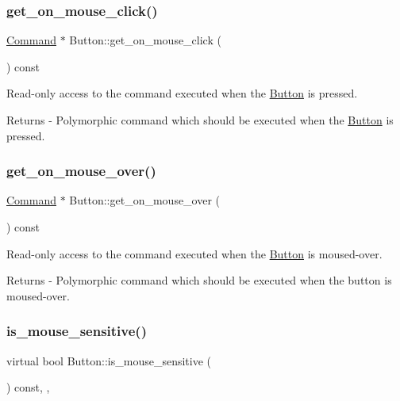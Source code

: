 \subsubsection{\texorpdfstring{get\+\_\+on\+\_\+mouse\+\_\+click()}{get\_on\_mouse\_click()}}
{\footnotesize\ttfamily \mbox{\hyperlink{class_command}{Command}} $\ast$ Button\+::get\+\_\+on\+\_\+mouse\+\_\+click (\begin{DoxyParamCaption}{ }\end{DoxyParamCaption}) const}

Read-\/only access to the command executed when the \mbox{\hyperlink{class_button}{Button}} is pressed. \begin{DoxyReturn}{Returns}
-\/ Polymorphic command which should be executed when the \mbox{\hyperlink{class_button}{Button}} is pressed. 
\end{DoxyReturn}
\mbox{\label{class_button_a3f9b964049bde58b8f39170ce8b6fa2e}} 
\subsubsection{\texorpdfstring{get\+\_\+on\+\_\+mouse\+\_\+over()}{get\_on\_mouse\_over()}}
{\footnotesize\ttfamily \mbox{\hyperlink{class_command}{Command}} $\ast$ Button\+::get\+\_\+on\+\_\+mouse\+\_\+over (\begin{DoxyParamCaption}{ }\end{DoxyParamCaption}) const}

Read-\/only access to the command executed when the \mbox{\hyperlink{class_button}{Button}} is moused-\/over. \begin{DoxyReturn}{Returns}
-\/ Polymorphic command which should be executed when the button is moused-\/over. 
\end{DoxyReturn}
\mbox{\label{class_button_aa2b16ae30fe74f215aa79c699bbf8510}} 
\subsubsection{\texorpdfstring{is\+\_\+mouse\+\_\+sensitive()}{is\_mouse\_sensitive()}}
{\footnotesize\ttfamily virtual bool Button\+::is\+\_\+mouse\+\_\+sensitive (\begin{DoxyParamCaption}{ }\end{DoxyParamCaption}) const\hspace{0.3cm}{\ttfamily [inline]}, {\ttfamily [override]}, {\ttfamily [virtual]}}

